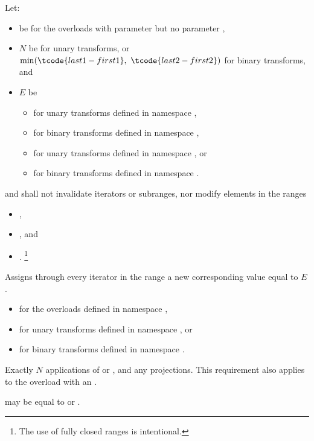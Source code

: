 \begin{itemdescr}
\pnum
Let:
\begin{itemize}
\setlength{\emergencystretch}{1em}
\item
   be 
  for the overloads with parameter 
  but no parameter ,
\item
  $N$ be  for unary transforms, or
  $\min(\tcode{last1 - first1}, \ \tcode{last2 - first2})$ for binary transforms, and
\item
  $E$ be
  \begin{itemize}
  \item
    for unary transforms defined in namespace ,
  \item
    for binary transforms defined in namespace ,
  \item
    for unary transforms defined in namespace , or
  \item
    for binary transforms defined in namespace .
  \end{itemize}
\end{itemize}

\pnum
\requires
{} and  shall not invalidate iterators or subranges, nor
modify elements in the ranges
\begin{itemize}
\item {},
\item {}, and
\item {}.%
\footnote{The use of fully closed ranges is intentional.}
\end{itemize}

\pnum
\effects
Assigns through every iterator 
in the range 
a new corresponding value equal to $E$.

\pnum
\returns
\begin{itemize}
\item
  for the overloads defined in namespace ,
\item
  for unary transforms defined in namespace , or
\item {}
  for binary transforms defined in namespace .
\end{itemize}

\pnum
\complexity
Exactly $N$ applications of  or , and
any projections.
This requirement also applies to the overload with an .

\pnum
\remarks
{} may be equal to  or .
\end{itemdescr}

